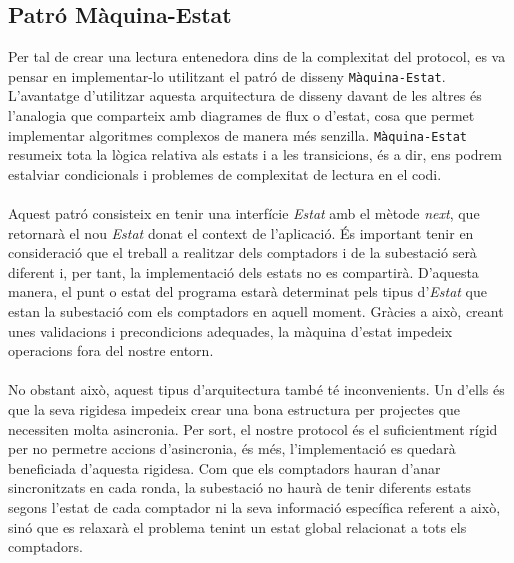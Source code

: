 \subsection{Patró Màquina-Estat}
Per tal de crear una lectura entenedora dins de la complexitat del protocol, es va pensar en implementar-lo utilitzant el patró de disseny \texttt{Màquina-Estat}. L'avantatge d'utilitzar aquesta arquitectura de disseny davant de les altres és l'analogia que comparteix amb diagrames de flux o d'estat, cosa que permet implementar algoritmes complexos de manera més senzilla. \texttt{Màquina-Estat} resumeix tota la lògica relativa als estats i a les transicions, és a dir, ens podrem estalviar condicionals i problemes de complexitat de lectura en el codi.
\\
\\
Aquest patró consisteix en tenir una interfície \textit{Estat} amb el mètode \textit{next}, que retornarà el nou \textit{Estat} donat el context de l'aplicació. És important tenir en consideració que el treball a realitzar dels comptadors i de la subestació serà diferent i, per tant, la implementació dels estats no es compartirà. D'aquesta manera, el punt o estat del programa estarà determinat pels tipus d'\textit{Estat} que estan la subestació com els comptadors en aquell moment. Gràcies a això, creant unes validacions i precondicions adequades, la màquina d’estat impedeix operacions fora del nostre entorn.
\\
\\
No obstant això, aquest tipus d'arquitectura també té inconvenients. Un d'ells és que la seva rigidesa impedeix crear una bona estructura per projectes que necessiten molta asincronia. Per sort, el nostre protocol és el suficientment rígid per no permetre accions d'asincronia, és més, l'implementació es quedarà beneficiada d'aquesta rigidesa. Com que els comptadors hauran d'anar sincronitzats en cada ronda, la subestació no haurà de tenir diferents estats segons l'estat de cada comptador ni la seva informació específica referent a això, sinó que es relaxarà el problema tenint un estat global relacionat a tots els comptadors.
